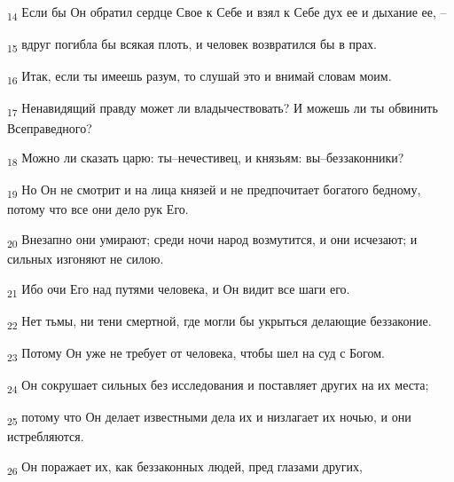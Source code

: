 \begin{tcolorbox}
\textsubscript{14} Если бы Он обратил сердце Свое к Себе и взял к Себе дух ее и дыхание ее, --
\end{tcolorbox}
\begin{tcolorbox}
\textsubscript{15} вдруг погибла бы всякая плоть, и человек возвратился бы в прах.
\end{tcolorbox}
\begin{tcolorbox}
\textsubscript{16} Итак, если ты имеешь разум, то слушай это и внимай словам моим.
\end{tcolorbox}
\begin{tcolorbox}
\textsubscript{17} Ненавидящий правду может ли владычествовать? И можешь ли ты обвинить Всеправедного?
\end{tcolorbox}
\begin{tcolorbox}
\textsubscript{18} Можно ли сказать царю: ты--нечестивец, и князьям: вы--беззаконники?
\end{tcolorbox}
\begin{tcolorbox}
\textsubscript{19} Но Он не смотрит и на лица князей и не предпочитает богатого бедному, потому что все они дело рук Его.
\end{tcolorbox}
\begin{tcolorbox}
\textsubscript{20} Внезапно они умирают; среди ночи народ возмутится, и они исчезают; и сильных изгоняют не силою.
\end{tcolorbox}
\begin{tcolorbox}
\textsubscript{21} Ибо очи Его над путями человека, и Он видит все шаги его.
\end{tcolorbox}
\begin{tcolorbox}
\textsubscript{22} Нет тьмы, ни тени смертной, где могли бы укрыться делающие беззаконие.
\end{tcolorbox}
\begin{tcolorbox}
\textsubscript{23} Потому Он уже не требует от человека, чтобы шел на суд с Богом.
\end{tcolorbox}
\begin{tcolorbox}
\textsubscript{24} Он сокрушает сильных без исследования и поставляет других на их места;
\end{tcolorbox}
\begin{tcolorbox}
\textsubscript{25} потому что Он делает известными дела их и низлагает их ночью, и они истребляются.
\end{tcolorbox}
\begin{tcolorbox}
\textsubscript{26} Он поражает их, как беззаконных людей, пред глазами других,
\end{tcolorbox}

